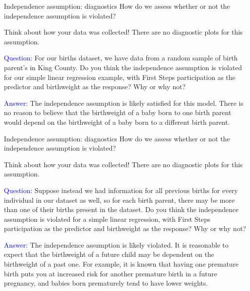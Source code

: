 \documentclass[10pt,t]{beamer}
\begin{document}
\begin{frame}{Independence assumption: diagnostics}
How do we assess whether or not the independence assumption is violated?

\vspace{0.3cm}

Think about how your data was collected! There are no diagnostic plots for this assumption.

\vspace{0.3cm}

\textcolor{blue}{Question:} For our births dataset, we have data from a random sample of birth parent's in King County. Do you think the independence assumption is violated for our simple linear regression example, with First Steps participation as the predictor and birthweight as the response? Why or why not? \pause

\vspace{0.3cm}

\textcolor{blue}{Answer:} The independence assumption is likely satisfied for this model. There is no reason to believe that the birthweight of a baby born to one birth parent would depend on the birthweight of a baby born to a different birth parent.

\end{frame}

\begin{frame}{Independence assumption: diagnostics}
How do we assess whether or not the independence assumption is violated?

\vspace{0.3cm}

Think about how your data was collected! There are no diagnostic plots for this assumption.

\vspace{0.3cm}

\textcolor{blue}{Question:} Suppose instead we had information for all previous births for every individual in our dataset as well, so for each birth parent, there may be more than one of their births present in the dataset. Do you think the independence assumption is violated for a simple linear regression, with First Steps participation as the predictor and birthweight as the response? Why or why not? \pause

\vspace{0.3cm}

\textcolor{blue}{Answer:} The independence assumption is likely violated. It is reasonable to expect that the birthweight of a future child may be dependent on the birthweight of a past one. For example, it is known that having one premature birth puts you at increased risk for another premature birth in a future pregnancy, and babies born prematurely tend to have lower weights. 

\end{frame}
\end{document}
